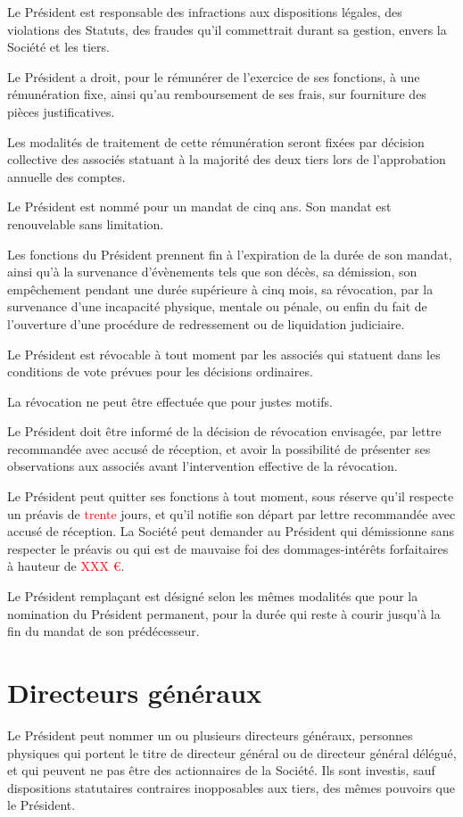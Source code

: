 \documentclass[a4paper,12pt]{report}
\begin{document}
Le Président est responsable des infractions aux dispositions légales, des violations des Statuts, des fraudes qu'il commettrait durant sa gestion, 
envers la Société et les tiers.

Le Président a droit, pour le rémunérer de l'exercice de ses fonctions, à une rémunération fixe, ainsi qu'au remboursement de ses frais, 
sur fourniture des pièces justificatives.

Les modalités de traitement de cette rémunération seront fixées par décision collective des associés statuant à la majorité des deux tiers 
lors de l'approbation annuelle des comptes.

Le Président est nommé pour un mandat de cinq ans. Son mandat est renouvelable sans limitation.

Les fonctions du Président prennent fin à l'expiration de la durée de son mandat, ainsi qu'à la survenance d'évènements tels que son décès, 
sa démission, son empêchement pendant une durée supérieure à cinq mois, sa révocation, par la survenance d'une incapacité physique, mentale ou pénale, 
ou enfin du fait de l'ouverture d'une procédure de redressement ou de liquidation judiciaire.

Le Président est révocable à tout moment par les associés qui statuent dans les conditions de vote prévues pour les décisions ordinaires.

La révocation ne peut être effectuée que pour justes motifs.

Le Président doit être informé de la décision de révocation envisagée, par lettre recommandée avec accusé de réception, 
et avoir la possibilité de présenter ses observations aux associés avant l'intervention effective de la révocation.

Le Président peut quitter ses fonctions à tout moment, sous réserve qu'il respecte un préavis de \textcolor{red}{trente} jours, 
et qu'il notifie son départ par lettre recommandée avec accusé de réception. 
La Société peut demander au Président qui démissionne sans respecter le préavis 
ou qui est de mauvaise foi des dommages-intérêts forfaitaires à hauteur de \textcolor{red}{XXX €}.

Le Président remplaçant est désigné selon les mêmes modalités que pour la nomination du Président permanent, 
pour la durée qui reste à courir jusqu'à la fin du mandat de son prédécesseur.

\section{Directeurs généraux}
Le Président peut nommer un ou plusieurs directeurs généraux, personnes physiques qui portent le titre de directeur général 
ou de directeur général délégué, et qui peuvent ne pas être des actionnaires de la Société. 
Ils sont investis, sauf dispositions statutaires contraires inopposables aux tiers, des mêmes pouvoirs que le Président.
\end{document}
